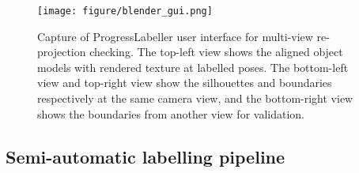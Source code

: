  \begin{figure}[htbp]
     \centering
     \texttt{[image: figure/blender\_gui.png]}
     \caption{Capture of ProgressLabeller user interface for multi-view re-projection checking. The top-left view shows the aligned object models with rendered texture at labelled poses. The bottom-left view and top-right view show the silhouettes and boundaries respectively at the same camera view, and the bottom-right view shows the boundaries from another view for validation.}
     \label{fig:blender_view}
 \end{figure}



\subsection{Semi-automatic labelling pipeline}


